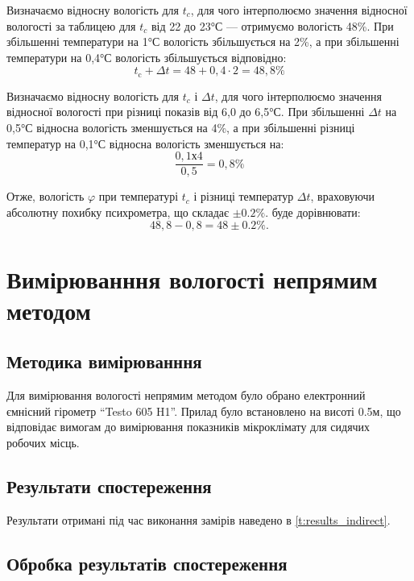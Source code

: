 Визначаємо відносну вологість для $t_c$, для чого інтерполюємо значення відносної вологості
за таблицею для $t_c$ від 22 до 23°С --- отримуємо вологість 48\%. При збільшенні температури на 1°С
вологість збільшується на 2\%, а при збільшенні температури на 0,4°С вологість збільшується
відповідно:
\begin{equation}
  t_{\text{c}} + \Delta t  =  48 +  0,4 \cdot 2 = 48,8\%
\end{equation}

Визначаємо відносну вологість для $t_c$ і $\Delta t$, для чого інтерполюємо значення відносної
вологості при різниці показів від 6,0 до 6,5°С. При збільшенні $\Delta t$ на 0,5°С відносна
вологість зменшується на 4\%, а при збільшенні різниці температур на 0,1°С відносна вологість
зменшується на:
\begin{equation}
  \frac{0,1х4}{0,5}=0,8\%
\end{equation}

Отже, вологість $\varphi$ при температурі $t_c$ і різниці температур $\Delta t$, враховуючи
абсолютну похибку психрометра, що складає $\pm 0.2\%$. буде дорівнювати:
\begin{equation}
  48,8 - 0,8 = 48 \pm 0.2\%.
\end{equation}

\section{Вимірюванння вологості непрямим методом}

\subsection{Методика вимірюванння}

Для вимірювання вологості непрямим методом було обрано електронний ємнісний гірометр ``Testo 605
H1''. Прилад було встановлено на висоті 0.5м, що відповідає вимогам до вимірювання показників
мікроклімату для сидячих робочих місць.

\subsection{Результати спостереження}

Результати отримані під час виконання замірів наведено в \ref{t:results_indirect}.
\setlength{\mathindent}{0pt}


\subsection{Обробка результатів спостереження}

